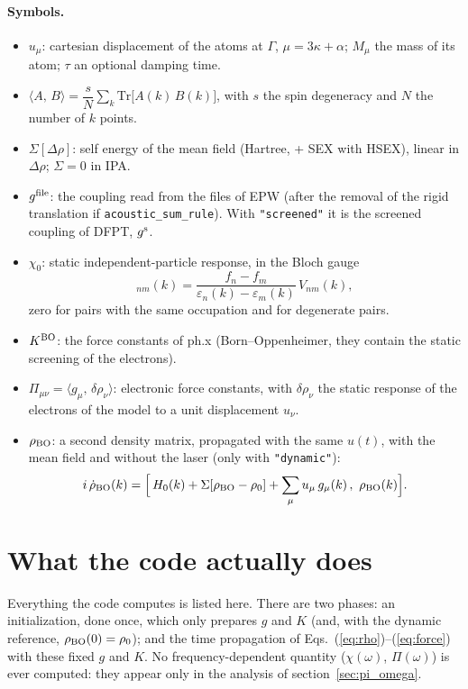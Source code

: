 \documentclass[11pt]{article}
\newcommand{\Dr}{\Delta\rho}
\newcommand{\gs}{g^{\rm s}}
\newcommand{\gf}{g^{\rm file}}
\newcommand{\KBO}{K^{\rm BO}}
\newcommand{\rBO}{\rho_{\rm BO}}
\newcommand{\inner}[2]{\langle #1,\,#2\rangle}
\begin{document}
\paragraph{Symbols.}
\begin{itemize}
\item $u_\mu$: cartesian displacement of the atoms at $\Gamma$, $\mu = 3\kappa+\alpha$; $M_\mu$ the mass of its atom;
  $\tau$ an optional damping time.
\item $\inner{A}{B} = \dfrac{s}{N}\sum_k \mathrm{Tr}\big[A(k)\,B(k)\big]$, with $s$ the spin degeneracy and $N$ the number
  of $k$ points.
\item $\Sigma[\Dr]$: self energy of the mean field (Hartree, + SEX with HSEX), linear in $\Dr$; $\Sigma = 0$ in IPA.
\item $\gf$: the coupling read from the files of EPW (after the removal of the rigid translation if
  \texttt{acoustic\_sum\_rule}). With \texttt{"screened"} it is the screened coupling of DFPT, $\gs$.
\item $\chi_0$: static independent-particle response, in the Bloch gauge
  \begin{equation}
  [\chi_0 V]_{nm}(k) = \frac{f_n-f_m}{\varepsilon_n(k)-\varepsilon_m(k)}\,V_{nm}(k),
  \end{equation}
  zero for pairs with the same occupation and for degenerate pairs.
\item $\KBO$: the force constants of ph.x (Born--Oppenheimer, they contain the static screening of the electrons).
\item $\Pi_{\mu\nu} = \inner{g_\mu}{\delta\rho_\nu}$: electronic force constants, with $\delta\rho_\nu$ the static
  response of the electrons of the model to a unit displacement $u_\nu$.
\item $\rBO$: a second density matrix, propagated with the same $u(t)$, with the mean field and without the laser
  (only with \texttt{"dynamic"}):
  \begin{equation}
  i\,\dot\rho_{\rm BO}(k) = \Big[\, H_0(k) + \Sigma[\rBO-\rho_0] + \sum_\mu u_\mu\, g_\mu(k)\,,\ \rBO(k) \Big].
  \label{eq:rhobo}
  \end{equation}
\end{itemize}

\section{What the code actually does}\label{sec:algorithm}
Everything the code computes is listed here. There are two phases: an initialization, done once, which only prepares
$g$ and $K$ (and, with the dynamic reference, $\rBO(0)=\rho_0$); and the time propagation of
Eqs.~(\ref{eq:rho})--(\ref{eq:force}) with these fixed $g$ and $K$. No frequency-dependent quantity ($\chi(\omega)$,
$\Pi(\omega)$) is ever computed: they appear only in the analysis of section~\ref{sec:pi_omega}.
\end{document}

